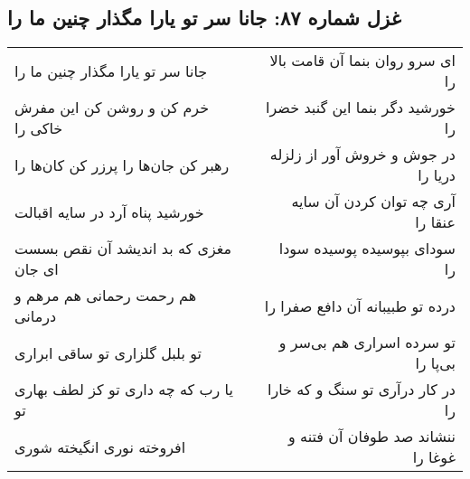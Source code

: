 \begin{center}
\section*{غزل شماره ۸۷: جانا سر تو یارا مگذار چنین ما را}
\label{sec:0087}
\begin{longtable}{l p{0.5cm} r}
جانا سر تو یارا مگذار چنین ما را
&&
ای سرو روان بنما آن قامت بالا را
\\
خرم کن و روشن کن این مفرش خاکی را
&&
خورشید دگر بنما این گنبد خضرا را
\\
رهبر کن جان‌ها را پرزر کن کان‌ها را
&&
در جوش و خروش آور از زلزله دریا را
\\
خورشید پناه آرد در سایه اقبالت
&&
آری چه توان کردن آن سایه عنقا را
\\
مغزی که بد اندیشد آن نقص بسست ای جان
&&
سودای بپوسیده پوسیده سودا را
\\
هم رحمت رحمانی هم مرهم و درمانی
&&
درده تو طبیبانه آن دافع صفرا را
\\
تو بلبل گلزاری تو ساقی ابراری
&&
تو سرده اسراری هم بی‌سر و بی‌پا را
\\
یا رب که چه داری تو کز لطف بهاری تو
&&
در کار درآری تو سنگ و که خارا را
\\
افروخته نوری انگیخته شوری
&&
ننشاند صد طوفان آن فتنه و غوغا را
\\
\end{longtable}
\end{center}
